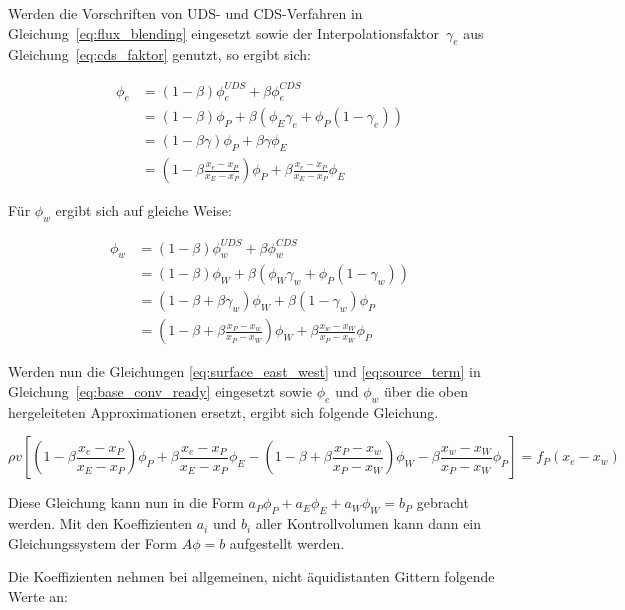 \documentclass[11pt, ngerman,colorback,accentcolor=tud2d]{tudreport}
\begin{document}
Werden die Vorschriften von UDS- und CDS-Verfahren in Gleichung~\eqref{eq:flux_blending}
eingesetzt sowie der Interpolationsfaktor~$\gamma_e$ aus Gleichung~\eqref{eq:cds_faktor} genutzt, so ergibt sich:

\begin{align}
  \phi_e &= (1-\beta)\phi_e^{UDS} + \beta \phi_e^{CDS} \nonumber\\
         &= (1-\beta)\phi_P + \beta \left({\phi_E\gamma_e + \phi_P (1-\gamma_e)}\right) \nonumber\\
         &= (1-\beta \gamma) \phi_P + \beta \gamma \phi_E\\
         &= \left({1-\beta \frac{x_e-x_P}{x_E-x_P}}\right) \phi_P + \beta \frac{x_e-x_P}{x_E-x_P} \phi_E
\end{align}

Für $\phi_w$ ergibt sich auf gleiche Weise:

\begin{align}
  \phi_w &= (1-\beta)\phi_w^{UDS} + \beta \phi_w^{CDS} \nonumber\\
         &= (1-\beta)\phi_W + \beta \left({\phi_W \gamma_w + \phi_P (1-\gamma_w)}\right) \nonumber\\
         &= (1-\beta +\beta \gamma_w)\phi_W + \beta (1-\gamma_w)\phi_P\\
         &= \left({1-\beta + \beta \frac{x_P-x_w}{x_P-x_W}}\right) \phi_W + \beta \frac{x_w-x_W}{x_P-x_W} \phi_P
\end{align}

Werden nun die Gleichungen \eqref{eq:surface_east_west} und \eqref{eq:source_term}
in Gleichung~\eqref{eq:base_conv_ready} eingesetzt sowie $\phi_e$ und $\phi_w$ über
die oben hergeleiteten Approximationen ersetzt, ergibt sich folgende Gleichung.

\begin{equation*}
  \rho v \left[{
    \left({1-\beta \frac{x_e-x_P}{x_E-x_P}}\right) \phi_P + \beta \frac{x_e-x_P}{x_E-x_P} \phi_E
    -\left({1-\beta + \beta \frac{x_P-x_w}{x_P-x_W}}\right) \phi_W - \beta \frac{x_w-x_W}{x_P-x_W} \phi_P
  }\right]
  = f_P(x_e-x_w)
\end{equation*}

Diese Gleichung kann nun in die Form $a_P \phi_P + a_E \phi_E + a_W \phi_W = b_P$
gebracht werden. Mit den Koeffizienten $a_i$ und $b_i$ aller Kontrollvolumen kann
dann ein Gleichungssystem der Form $A\phi = b$ aufgestellt werden.

Die Koeffizienten nehmen bei allgemeinen, nicht äquidistanten Gittern folgende Werte
an:
\end{document}
